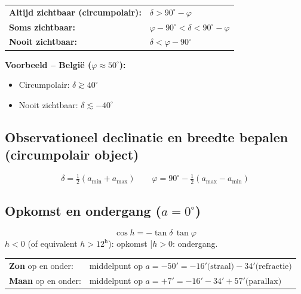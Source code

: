 \documentclass[11pt, a4paper]{article}
\newcommand{\graden}{^{\circ}}
\newcommand{\boogmin}{'}
\begin{document}
\begin{formule}
\renewcommand{\arraystretch}{1.4}
\begin{tabular}{ll}
  \textbf{Altijd zichtbaar (circumpolair):} & $\delta > 90\graden - \varphi$ \\
  \textbf{Soms zichtbaar:}                  & $\varphi - 90\graden < \delta < 90\graden - \varphi$ \\
  \textbf{Nooit zichtbaar:}                 & $\delta < \varphi - 90\graden$ \\
\end{tabular}

\medskip
\textbf{Voorbeeld -- België ($\varphi \approx 50\graden$):}
\begin{itemize}[leftmargin=1.5em, itemsep=1pt]
  \item Circumpolair: $\delta \gtrsim 40\graden$
  \item Nooit zichtbaar: $\delta \lesssim -40\graden$
\end{itemize}
\end{formule}

\subsection{Observationeel declinatie en breedte bepalen (circumpolair object)}

\begin{formule}
\[
  \delta = \tfrac{1}{2}(a_\mathrm{min} + a_\mathrm{max})
  \qquad
  \varphi = 90\graden - \tfrac{1}{2}(a_\mathrm{max} - a_\mathrm{min})
\]
\end{formule}

\subsection{Opkomst en ondergang ($a = 0\graden$)}

\begin{formule}
\[
  \cos h = -\tan\delta\,\tan\varphi
\]
$h < 0$ (of equivalent $h > 12^\mathrm{h}$): opkomst \quad|\quad $h > 0$: ondergang.
\end{formule}

\begin{opgelet}
\renewcommand{\arraystretch}{1.3}
\begin{tabular}{ll}
  \textbf{Zon} op en onder: & middelpunt op $a = -50\boogmin = -16\boogmin\text{(straal)} - 34\boogmin\text{(refractie)}$ \\
  \textbf{Maan} op en onder: & middelpunt op $a = +7\boogmin = -16\boogmin - 34\boogmin + 57\boogmin\text{(parallax)}$ \\
\end{tabular}
\end{opgelet}
\end{document}
